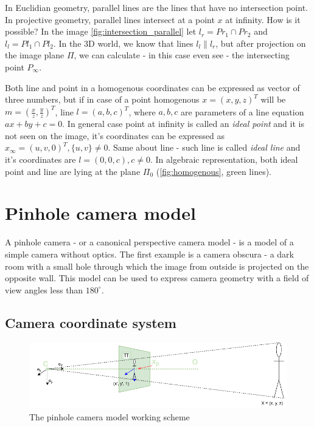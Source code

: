 In Euclidian geometry, parallel lines are the lines that have no intersection point. 
In projective geometry, parallel lines intersect at a point $x$ at infinity. 
How is it possible? 
In the image \autoref{fig:intersection_parallel} let $l_r = Pr_1 \cap Pr_2 $ and $l_l = Pl_1 \cap Pl_2$. 
In the 3D world, we know that lines $l_l \parallel l_r$, but after projection on the image plane $\Pi$, we can calculate - in this case even see - the intersecting point $P_{\infty}$. 

Both line and point in a homogenous coordinates can be expressed as vector of three numbers, but if in case of a point homogenous $x = (x, y, z)^T$ will be $m = (\frac{x}{z}, \frac{y}{z})^T$, line $l = (a, b, c)^T$, where $a, b, c$ are parameters of a line equation $ax + by + c = 0$. 
In general case point at infinity is called an \textit{ideal point} and it is not seen on the image, it's coordinates can be expressed as $x_{\infty} = (u, v, 0)^T, \{u, v\} \neq 0$. Same about line - such line is called \textit{ideal line} and it's coordinates are $l = (0, 0, c), c \neq 0$. In algebraic representation, both ideal point and line are lying at the plane $\Pi_0$ (\autoref{fig:homogenous}, green lines).

\section{Pinhole camera model}
A pinhole camera - or a canonical perspective camera model - is a model of a simple camera without optics.
The first example is a camera obscura - a dark room with a small hole through which the image from outside is projected on the opposite wall. 
This model can be used to express camera geometry with a field of view angles less than $180^{\circ}$.

\subsection{Camera coordinate system}
\begin{figure}[h]
    \centering
    \includegraphics[width=1\textwidth]{graphics/td_scene.png}
    \caption{The pinhole camera model working scheme}
    \label{fig:td_scene_3d}
\end{figure}

